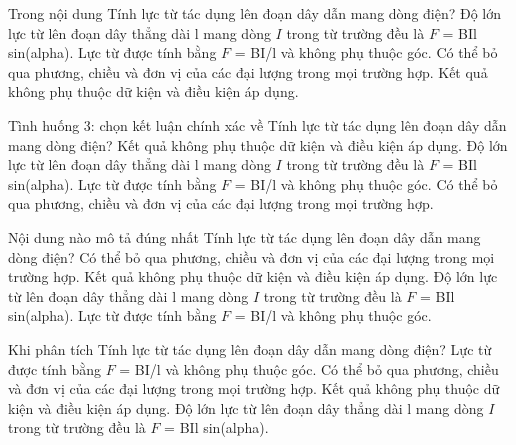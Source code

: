 \begin{ex}
Trong nội dung Tính lực từ tác dụng lên đoạn dây dẫn mang dòng điện?
\choice
{\True Độ lớn lực từ lên đoạn dây thẳng dài l mang dòng $I$ trong từ trường đều là $F$ = BIl sin(alpha).}
{Lực từ được tính bằng $F$ = BI/l và không phụ thuộc góc.}
{Có thể bỏ qua phương, chiều và đơn vị của các đại lượng trong mọi trường hợp.}
{Kết quả không phụ thuộc dữ kiện và điều kiện áp dụng.}
\end{ex}

\begin{ex}
Tình huống 3: chọn kết luận chính xác về Tính lực từ tác dụng lên đoạn dây dẫn mang dòng điện?
\choice
{Kết quả không phụ thuộc dữ kiện và điều kiện áp dụng.}
{\True Độ lớn lực từ lên đoạn dây thẳng dài l mang dòng $I$ trong từ trường đều là $F$ = BIl sin(alpha).}
{Lực từ được tính bằng $F$ = BI/l và không phụ thuộc góc.}
{Có thể bỏ qua phương, chiều và đơn vị của các đại lượng trong mọi trường hợp.}
\end{ex}

\begin{ex}
Nội dung nào mô tả đúng nhất Tính lực từ tác dụng lên đoạn dây dẫn mang dòng điện?
\choice
{Có thể bỏ qua phương, chiều và đơn vị của các đại lượng trong mọi trường hợp.}
{Kết quả không phụ thuộc dữ kiện và điều kiện áp dụng.}
{\True Độ lớn lực từ lên đoạn dây thẳng dài l mang dòng $I$ trong từ trường đều là $F$ = BIl sin(alpha).}
{Lực từ được tính bằng $F$ = BI/l và không phụ thuộc góc.}
\end{ex}

\begin{ex}
Khi phân tích Tính lực từ tác dụng lên đoạn dây dẫn mang dòng điện?
\choice
{Lực từ được tính bằng $F$ = BI/l và không phụ thuộc góc.}
{Có thể bỏ qua phương, chiều và đơn vị của các đại lượng trong mọi trường hợp.}
{Kết quả không phụ thuộc dữ kiện và điều kiện áp dụng.}
{\True Độ lớn lực từ lên đoạn dây thẳng dài l mang dòng $I$ trong từ trường đều là $F$ = BIl sin(alpha).}
\end{ex}

